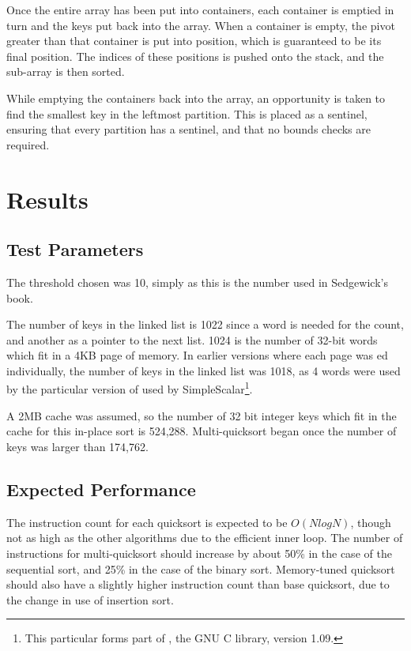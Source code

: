Once the entire array has been put into containers, each container is emptied
in turn and the keys put back into the array. When a container is empty, the
pivot greater than that container is put into position, which is guaranteed to
be its final position.  The indices of these positions is pushed onto the
stack, and the sub-array is then sorted.

While emptying the containers back into the array, an opportunity is taken to
find the smallest key in the leftmost partition. This is placed as a sentinel,
ensuring that every partition has a sentinel, and that no bounds checks are
required.

\section{Results}

\subsection{Test Parameters}

The threshold chosen was 10, simply as this is the number used in Sedgewick's
book.

The number of keys in the linked list is 1022 since a word is needed for the
count, and another as a pointer to the next list. 1024 is the number of 32-bit
words which fit in a 4KB page of memory. In earlier versions where each page was
ed individually, the number of keys in the linked list was 1018,
as 4 words were used by the particular version of  used by
SimpleScalar\footnote{This particular  forms part of
, the GNU C library, version 1.09.}.

A 2MB cache was assumed, so the number of 32 bit integer keys which fit in the
cache for this in-place sort is 524,288. Multi-quicksort began once the number
of keys was larger than 174,762.

\subsection{Expected Performance}

The instruction count for each quicksort is expected to be $O(NlogN)$, though
not as high as the other algorithms due to the efficient inner loop.  The number
of instructions for multi-quicksort should increase by about 50\% in the case of
the sequential sort, and 25\% in the case of the binary sort. Memory-tuned
quicksort should also have a slightly higher instruction count than base
quicksort, due to the change in use of insertion sort.

